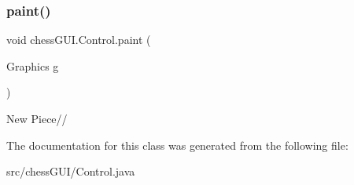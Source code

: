\subsubsection{\texorpdfstring{paint()}{paint()}}
{\footnotesize\ttfamily void chess\+G\+U\+I.\+Control.\+paint (\begin{DoxyParamCaption}\item[{Graphics}]{g }\end{DoxyParamCaption})}

New Piece// 

The documentation for this class was generated from the following file\+:\begin{DoxyCompactItemize}
\item 
src/chess\+G\+U\+I/Control.\+java\end{DoxyCompactItemize}
